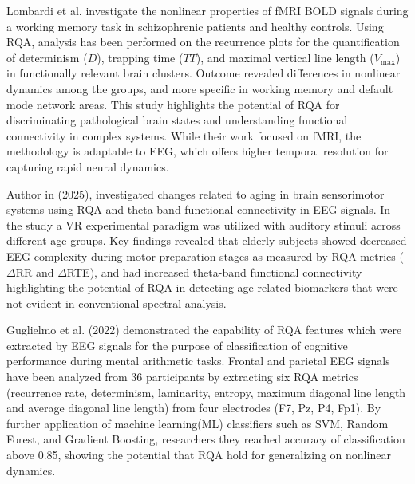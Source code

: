 \documentclass{article}
\begin{document}
Lombardi et al.\cite{Lombardi2014} investigate the nonlinear properties of fMRI BOLD signals 
during a working memory task in schizophrenic patients and healthy controls. 
Using RQA, analysis has been performed on the recurrence plots for the quantification of 
determinism ($D$), trapping time ($TT$), and maximal vertical line length ($V_{\max}$) 
in functionally relevant brain clusters. 
Outcome revealed differences in nonlinear dynamics among the groups, 
and more specific in working memory and default mode network areas. 
This study highlights the potential of RQA for discriminating pathological brain states and understanding 
functional connectivity in complex systems. While their work focused on fMRI, the methodology is adaptable
to EEG, which offers higher temporal resolution for capturing rapid neural dynamics.

Author in\cite{pitsik} (2025), investigated changes related to aging in brain sensorimotor systems using 
RQA and theta-band functional connectivity in EEG signals. 
In the study a VR experimental paradigm was utilized with auditory 
stimuli across different age groups. 
Key findings revealed that elderly subjects showed decreased EEG complexity during motor preparation stages as 
measured by RQA metrics ($\Delta$RR and $\Delta$RTE), 
and had increased theta-band functional connectivity highlighting the potential of RQA in detecting 
age-related biomarkers that were not evident in conventional spectral analysis. 


Guglielmo et al. (2022)\cite{guglielmo} demonstrated the capability of 
RQA features which were extracted by EEG signals for the purpose of classification
of cognitive performance during mental arithmetic tasks. Frontal and parietal EEG signals 
have been analyzed from 36 participants by extracting six RQA metrics (recurrence rate, determinism, 
laminarity, entropy, maximum diagonal line length and average diagonal line length) from four electrodes (F7, Pz, P4, Fp1). 
By further application of machine learning(ML) classifiers such as SVM, Random Forest, and Gradient Boosting, researchers
they reached accuracy of classification above 0.85, showing the potential that RQA hold for generalizing on nonlinear dynamics.
\end{document}
